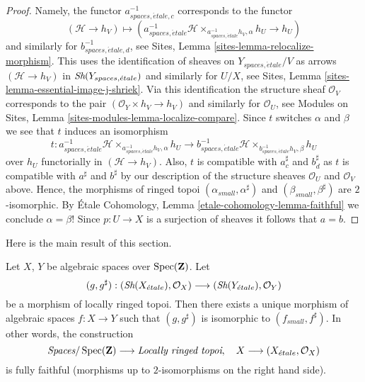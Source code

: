 \begin{proof}
Namely, the functor $a_{spaces, \acute{e}tale, c}^{-1}$ corresponds
to the functor
$$
(\mathcal{H} \to h_V) \longmapsto
(a_{spaces, \acute{e}tale}^{-1}\mathcal{H}
\times_{a_{spaces, \acute{e}tale}^{-1}h_V, \alpha}
h_U \to
h_U)
$$
and similarly for $b_{spaces, \acute{e}tale, d}^{-1}$, see
Sites, Lemma \ref{sites-lemma-relocalize-morphism}.
This uses the identification of sheaves on $Y_{spaces, \acute{e}tale}/V$
as arrows $(\mathcal{H} \to h_V)$ in $\mathop{\textit{Sh}}\nolimits(Y_{spaces, \acute{e}tale})$
and similarly for $U/X$, see
Sites, Lemma \ref{sites-lemma-essential-image-j-shriek}.
Via this identification the structure sheaf $\mathcal{O}_V$ corresponds to the
pair $(\mathcal{O}_Y \times h_V \to h_V)$ and similarly
for $\mathcal{O}_U$, see
Modules on Sites,
Lemma \ref{sites-modules-lemma-localize-compare}.
Since $t$ switches $\alpha$ and $\beta$ we see that $t$ induces an isomorphism
$$
t :
a_{spaces, \acute{e}tale}^{-1}\mathcal{H}
\times_{a_{spaces, \acute{e}tale}^{-1}h_V, \alpha}
h_U
\longrightarrow
b_{spaces, \acute{e}tale}^{-1}\mathcal{H}
\times_{b_{spaces, \acute{e}tale}^{-1}h_V, \beta}
h_U
$$
over $h_U$ functorially in $(\mathcal{H} \to h_V)$. Also, $t$ is compatible
with $a_c^\sharp$ and $b_d^\sharp$ as $t$ is
compatible with $a^\sharp$ and $b^\sharp$ by our description
of the structure sheaves $\mathcal{O}_U$ and $\mathcal{O}_V$
above. Hence, the morphisms of ringed topoi
$(\alpha_{small}, \alpha^\sharp)$ and $(\beta_{small}, \beta^\sharp)$
are $2$-isomorphic. By
\'Etale Cohomology, Lemma \ref{etale-cohomology-lemma-faithful}
we conclude $\alpha = \beta$! Since $p : U \to X$ is a surjection
of sheaves it follows that $a = b$.
\end{proof}

\noindent
Here is the main result of this section.

\begin{theorem}
\label{theorem-fully-faithful}
Let $X$, $Y$ be algebraic spaces over $\mathop{\rm Spec}(\mathbf{Z})$.
Let
$$
(g, g^\sharp) :
(\mathop{\textit{Sh}}\nolimits(X_{\acute{e}tale}), \mathcal{O}_X)
\longrightarrow
(\mathop{\textit{Sh}}\nolimits(Y_{\acute{e}tale}), \mathcal{O}_Y)
$$
be a morphism of locally ringed topoi. Then there exists a
unique morphism of algebraic spaces $f : X \to Y$ such that
$(g, g^\sharp)$ is isomorphic to $(f_{small}, f^\sharp)$.
In other words, the construction
$$
\textit{Spaces}/\mathop{\rm Spec}(\mathbf{Z})
\longrightarrow \textit{Locally ringed topoi},
\quad
X \longrightarrow (X_{\acute{e}tale}, \mathcal{O}_X)
$$
is fully faithful (morphisms up to $2$-isomorphisms on the right hand side).
\end{theorem}

